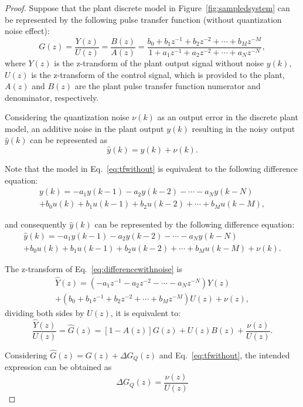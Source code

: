 \documentclass{sig-alternate-05-2015}
\begin{document}
%
\begin{proof}
%
Suppose that the plant discrete model in Figure~\ref{fig:sampledsystem} can
be represented by the following pulse transfer function (without
quantization noise effect):
%
\begin{equation}
\label{eq:tfwithout}
G(z)=\frac{Y(z)}{U(z)}=\frac{B(z)}{A(z)}=\frac{b_{0}+b_{1}z^{-1}+b_{2}z^{-2}+\cdots+b_{M}z^{-M}}{1+a_{1}z^{-1}+a_{2}z^{-2}+\cdots+a_{N}z^{-N}},
\end{equation}
%
\noindent where $Y(z)$ is the z-transform of the plant output signal without
noise $y(k)$, $U(z)$ is the z-transform of the control signal, which is
provided to the plant, $A(z)$ and $B(z)$ are the plant pulse transfer
function numerator and denominator, respectively.

Considering the quantization noise $\nu(k)$ as an output error in the
discrete plant model, an additive noise in the plant output $y(k)$ resulting
in the noisy output $\hat{y}(k)$ can be represented as
%
\begin{equation}
\hat{y}(k)=y(k)+\nu(k).
\end{equation}

Note that the model in Eq.~\eqref{eq:tfwithout} is equivalent to the
following difference equation:
%
\begin{equation}
\begin{split}
y(k)=-a_{1}y(k-1)-a_{2}y(k-2)-\cdots - a_{N}y(k-N)\\
+b_{0}u(k)+b_{1}u(k-1)+b_{2}u(k-2)+\cdots+b_{M}u(k-M),
\end{split}
\end{equation}

\noindent and consequently $\hat{y}(k)$ can be represented by the following
difference equation:
%
\begin{equation}
\label{eq:differencewithnoise}
\begin{split}
\hat{y}(k)=-a_{1}y(k-1)-a_{2}y(k-2)-\cdots - a_{N}y(k-N)\\
+b_{0}u(k)+b_{1}u(k-1)+b_{2}u(k-2)+\cdots+b_{M}u(k-M)+\nu(k).
\end{split}
\end{equation}

The z-transform of Eq.~\eqref{eq:differencewithnoise} is
%
\begin{equation}
\begin{split}
\hat{Y}(z)=(-a_{1}z^{-1}-a_{2}z^{-2}-\cdots-a_{N}z^{-N})Y(z)\\
+(b_{0}+b_{1}z^{-1}+b_{2}z^{-2}+\cdots+b_{M}z^{-M})U(z)+\nu(z),
\end{split}
\end{equation}
dividing both sides by $U(z)$, it is equivalent to:
\begin{equation}
\frac{\hat{Y}(z)}{U(z)}=\hat{G}(z)=[1-A(z)]G(z)+U(z)B(z)+\frac{\nu(z)}{U(z)}.
\end{equation}

Considering $\hat{G}(z)=G(z)+\Delta{G_{Q}(z)}$ and Eq.~\eqref{eq:tfwithout},
the intended expression can be obtained as
%
\begin{equation}
\Delta{G_{Q}(z)}=\frac{\nu(z)}{U(z)} 
\end{equation}
\end{proof}
\end{document}
